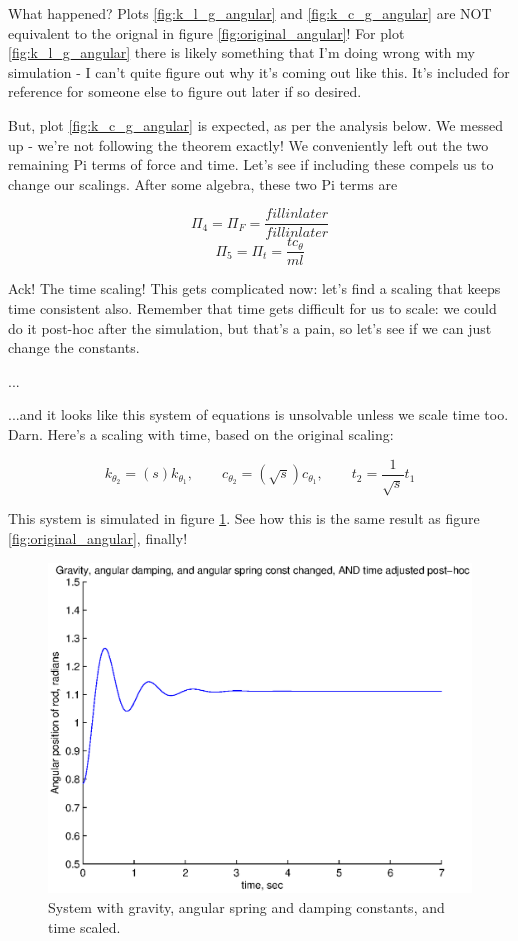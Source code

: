 \documentclass[12pt,letterpaper]{article}
\begin{document}
What happened? Plots \ref{fig:k_l_g_angular} and \ref{fig:k_c_g_angular} are NOT equivalent to the orignal in figure \ref{fig:original_angular}! 
For plot \ref{fig:k_l_g_angular} there is likely something that I'm doing wrong with my simulation - I can't quite figure out why it's coming out like this.
It's included for reference for someone else to figure out later if so desired.


But, plot \ref{fig:k_c_g_angular} is expected, as per the analysis below.
We messed up - we're not following the theorem exactly! 
We conveniently left out the two remaining Pi terms of force and time. 
Let's see if including these compels us to change our scalings.
After some algebra, these two Pi terms are

\[
\Pi_4 = \Pi_{F} = \frac{fill in later}{fill in later}
\]
\[
\Pi_5 = \Pi_{t} = \frac{tc_{\theta}}{ml}
\]

Ack! The time scaling! 
This gets complicated now: let's find a scaling that keeps time consistent also.
Remember that time gets difficult for us to scale: we could do it post-hoc after the simulation, but that's a pain, so let's see if we can just change the constants.

...

...and it looks like this system of equations is unsolvable unless we scale time too. Darn. 
Here's a scaling with time, based on the original scaling:

\[
k_{\theta_2} = (s) k_{\theta_1}, \quad \quad c_{\theta_2} = (\sqrt{s}) c_{\theta_1}, \quad \quad t_2 = \frac{1}{\sqrt{s}} t_1
\]

This system is simulated in figure \ref{fig:k_c_t_g_angular}. See how this is the same result as figure \ref{fig:original_angular}, finally!

\begin{figure}[ht]
  \centering
  \includegraphics[width=.48\linewidth]{img/k_c_t_g_angular.eps}
  \caption{System with gravity, angular spring and damping constants, and time scaled. }
  \label{fig:k_c_t_g_angular}
\end{figure}
\end{document}
